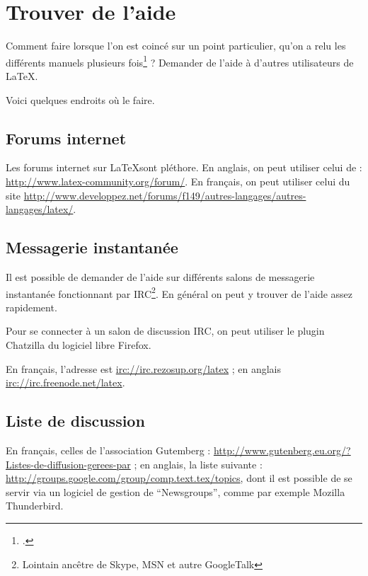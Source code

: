 \chapter{Trouver de l'aide}

\begin{intro}
Comment faire lorsque l'on est coincé sur un point particulier, qu'on a relu les différents manuels plusieurs fois\footcite[Signalons au passage la possibilité de télécharger une aide sur l'ensemble des erreurs de compilation avec \LaTeX :][]{erreurscompilo} ? Demander de l'aide à d'autres utilisateurs de \LaTeX{}.

Voici quelques endroits où le faire. 
\end{intro}


\section{Forums internet}

Les forums internet sur \LaTeX sont pléthore. En anglais, on peut utiliser celui de  : \url{http://www.latex-community.org/forum/}. En français, on peut utiliser celui du site  \url{http://www.developpez.net/forums/f149/autres-langages/autres-langages/latex/}.


\section{Messagerie instantanée}

Il est possible de demander de l'aide sur différents salons de messagerie instantanée fonctionnant par IRC\footnote{Lointain ancêtre de Skype, MSN et autre GoogleTalk}. En général on peut y trouver de l'aide assez rapidement.

Pour se connecter à un salon de discussion IRC, on peut utiliser le plugin Chatzilla du logiciel libre Firefox.

En français, l'adresse est \url{irc://irc.rezosup.org/latex} ; en anglais
\url{irc://irc.freenode.net/latex}.


\section{Liste de discussion}

En français, celles de l'association Gutemberg : \url{http://www.gutenberg.eu.org/?Listes-de-diffusion-gerees-par} ; en anglais,  la liste suivante : \url{http://groups.google.com/group/comp.text.tex/topics}, dont il est possible de se servir via un logiciel de gestion de \enquote{Newsgroups}, comme par exemple Mozilla Thunderbird.
